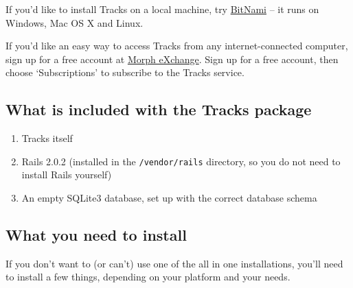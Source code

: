 \documentclass[10pt,twoside]{memoir}
\begin{document}
If you'd like to install Tracks on a local machine, try \href{http://bitnami.org/stack/tracks}{BitNami} -- it runs on Windows, Mac OS X and Linux.


If you'd like an easy way to access Tracks from any internet-connected computer, sign up for a free account at \href{http://www.morphexchange.com/}{Morph eXchange}. Sign up for a free account, then choose `Subscriptions' to subscribe to the Tracks service.


\subsection{What is included with the Tracks package}
\label{whatisincludedwiththetrackspackage}

\begin{enumerate}


\item Tracks itself

\item Rails 2.0.2 (installed in the \texttt{/vendor/rails} directory, so you do not need to install Rails yourself)

\item An empty SQLite3 database, set up with the correct database schema
\end{enumerate}

\subsection{What you need to install}
\label{whatyouneed}

If you don't want to (or can't) use one of the all in one installations, you'll need to install a few things, depending on your platform and your needs.
\end{document}
